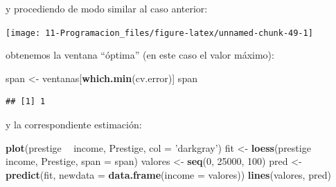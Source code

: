 \documentclass[]{book}
\newenvironment{Shaded}{\begin{snugshade}}{\end{snugshade}}
\newcommand{\CommentTok}[1]{\textcolor[rgb]{0.56,0.35,0.01}{\textit{#1}}}
\newcommand{\ControlFlowTok}[1]{\textcolor[rgb]{0.13,0.29,0.53}{\textbf{#1}}}
\newcommand{\DataTypeTok}[1]{\textcolor[rgb]{0.13,0.29,0.53}{#1}}
\newcommand{\DecValTok}[1]{\textcolor[rgb]{0.00,0.00,0.81}{#1}}
\newcommand{\FloatTok}[1]{\textcolor[rgb]{0.00,0.00,0.81}{#1}}
\newcommand{\KeywordTok}[1]{\textcolor[rgb]{0.13,0.29,0.53}{\textbf{#1}}}
\newcommand{\NormalTok}[1]{#1}
\newcommand{\OperatorTok}[1]{\textcolor[rgb]{0.81,0.36,0.00}{\textbf{#1}}}
\newcommand{\StringTok}[1]{\textcolor[rgb]{0.31,0.60,0.02}{#1}}
\begin{document}
y procediendo de modo similar al caso anterior:

\begin{Shaded}
\end{Shaded}

\begin{center}\texttt{[image: 11-Programacion\_files/figure-latex/unnamed-chunk-49-1]} \end{center}

obtenemos la ventana ``óptima'' (en este caso el valor máximo):

\begin{Shaded}
\begin{Highlighting}[]
\NormalTok{span <-}\StringTok{ }\NormalTok{ventanas[}\KeywordTok{which.min}\NormalTok{(cv.error)]}
\NormalTok{span}
\end{Highlighting}
\end{Shaded}

\begin{verbatim}
## [1] 1
\end{verbatim}

y la correspondiente estimación:

\begin{Shaded}
\begin{Highlighting}[]
\KeywordTok{plot}\NormalTok{(prestige }\OperatorTok{~}\StringTok{ }\NormalTok{income, Prestige, }\DataTypeTok{col =} \StringTok{'darkgray'}\NormalTok{)}
\NormalTok{fit <-}\StringTok{ }\KeywordTok{loess}\NormalTok{(prestige }\OperatorTok{~}\StringTok{ }\NormalTok{income, Prestige, }\DataTypeTok{span =}\NormalTok{ span)}
\NormalTok{valores <-}\StringTok{ }\KeywordTok{seq}\NormalTok{(}\DecValTok{0}\NormalTok{, }\DecValTok{25000}\NormalTok{, }\DecValTok{100}\NormalTok{)}
\NormalTok{pred <-}\StringTok{ }\KeywordTok{predict}\NormalTok{(fit, }\DataTypeTok{newdata =} \KeywordTok{data.frame}\NormalTok{(}\DataTypeTok{income =}\NormalTok{ valores))}
\KeywordTok{lines}\NormalTok{(valores, pred)}
\end{Highlighting}
\end{Shaded}
\end{document}
